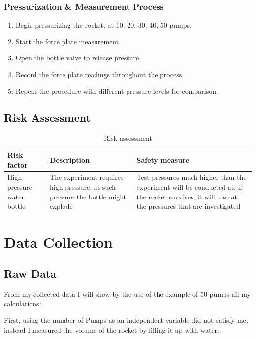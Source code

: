 \documentclass[12pt,a4paper]{article}
\begin{document}
\subsubsection{Pressurization \& Measurement Process}
\begin{enumerate}
\item Begin pressurizing the rocket, at 10, 20, 30, 40, 50 pumps.
\item Start the force plate measurement.
\item Open the bottle valve to release pressure.
\item Record the force plate readings throughout the process.
\item Repeat the procedure with different pressure levels for comparison.
\end{enumerate}

\subsection{Risk Assessment}

\begin{table}[H]
\centering
\caption{Risk assessment}
\begin{tabular}{@{}p{4cm}p{6cm}p{6cm}@{}}
\toprule
\textbf{Risk factor} & \textbf{Description} & \textbf{Safety measure} \\
\midrule
High pressure water bottle & The experiment requires high pressure, at such pressure the bottle might explode & Test pressures much higher than the experiment will be conducted at, if the rocket survives, it will also at the pressures that are investigated \\
\bottomrule
\end{tabular}
\end{table}

\section{Data Collection}

\subsection{Raw Data}

From my collected data I will show by the use of the example of 50 pumps all my calculations:

First, using the number of Pumps as an independent variable did not satisfy me, instead I measured the volume of the rocket by filling it up with water.
\end{document}
